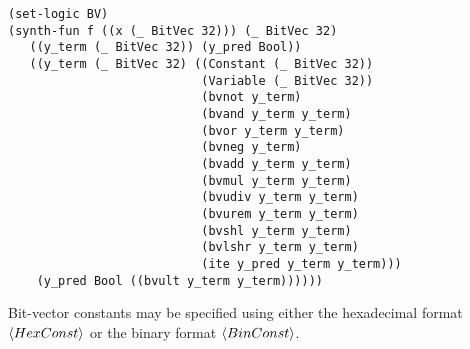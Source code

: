 \documentclass[english,a4paper,10pt]{article}
\begin{document}
\begin{appendix}
\begin{comment}
\begin{lstlisting}[language=SyGuS]
(set-logic BV)
(synth-fun f ((x (_ BitVec 32))) (_ BitVec 32)
   ((y_term (_ BitVec 32)) (y_pred Bool))
   ((y_term (_ BitVec 32) ((Constant (_ BitVec 32))
                           (Variable (_ BitVec 32))
                           (bvnot y_term)
                           (bvand y_term y_term)
                           (bvor y_term y_term)
                           (bvneg y_term)
                           (bvadd y_term y_term)
                           (bvmul y_term y_term)
                           (bvudiv y_term y_term)
                           (bvurem y_term y_term)
                           (bvshl y_term y_term)
                           (bvlshr y_term y_term)
                           (bvnand y_term y_term)
                           (bvnor y_term y_term)
                           (bvxor y_term y_term)
                           (bvxnor y_term y_term)
                           (bvsub y_term y_term)
                           (bvsdiv y_term y_term)
                           (bvsrem y_term y_term)
                           (bvsmod y_term y_term)
                           (bvashr y_term y_term)
                           (ite y_pred y_term y_term)))
    (y_pred Bool (...
                  (bvult y_term y_term)
                  (bvule y_term y_term)
                  (bvugt y_term y_term)
                  (bvuge y_term y_term)
                  (bvslt y_term y_term)
                  (bvsle y_term y_term)
                  (bvsgt y_term y_term)
                  (bvsge y_term y_term))))))
\end{lstlisting}
\end{comment}
\begin{lstlisting}[language=SyGuS]
(set-logic BV)
(synth-fun f ((x (_ BitVec 32))) (_ BitVec 32)
   ((y_term (_ BitVec 32)) (y_pred Bool))
   ((y_term (_ BitVec 32) ((Constant (_ BitVec 32))
                           (Variable (_ BitVec 32))
                           (bvnot y_term)
                           (bvand y_term y_term)
                           (bvor y_term y_term)
                           (bvneg y_term)
                           (bvadd y_term y_term)
                           (bvmul y_term y_term)
                           (bvudiv y_term y_term)
                           (bvurem y_term y_term)
                           (bvshl y_term y_term)
                           (bvlshr y_term y_term)
                           (ite y_pred y_term y_term)))
    (y_pred Bool ((bvult y_term y_term))))))
\end{lstlisting}
Bit-vector constants may be specified
using either the hexadecimal format $\left\langle HexConst\right\rangle$
or the binary format $\left\langle BinConst\right\rangle$.



\end{appendix}
\end{document}
